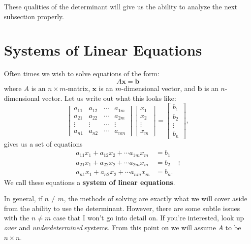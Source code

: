         These qualities of the determinant will give us the ability to analyze the next subsection properly.
        
        
        \section{Systems of Linear Equations}
        Often times we wish to solve equations of the form:
        \[
        A\mathbf{x}=\mathbf{b}
        \]
        where $A$ is an $n\times m$-matrix, $\mathbf{x}$ is an $m$-dimensional vector, and $\mathbf{b}$ is an $n$-dimensional vector.  Let us write out what this looks like:
        \[
        \begin{bmatrix}
        a_{11} & a_{12} & \cdots & a_{1m}\\
        a_{21} & a_{22} & \cdots & a_{2m}\\
        \vdots & \vdots & \cdots & \vdots\\
        a_{n1} & a_{n2} & \cdots & a_{nm}
        \end{bmatrix}
        \begin{bmatrix}
        x_1\\ x_2 \\ \vdots \\ x_m
        \end{bmatrix}
        =\begin{bmatrix}
        b_1 \\ b_2 \\ \vdots \\ b_n
        \end{bmatrix},
        \]
        gives us a set of equations
        \begin{align*}
        a_{11} x_1 + a_{12}x_2 + \cdots a_{1m} x_m &= b_1\\
        a_{21} x_1 + a_{22} x_2 + \cdots a_{2m} x_m &= b_2
        &\vdots\\
        a_{n1} x_1 + a_{n2} x_2 + \cdots a_{nm} x_m &= b_n.
        \end{align*}
        We call these equations a \textbf{system of linear equations}.
        
        In general, if $n\neq m$, the methods of solving are exactly what we will cover aside from the ability to use the determinant.  However, there are some subtle issues with the $n\neq m$ case that I won't go into detail on.  If you're interested, look up \emph{over} and \emph{underdetermined} systems. From this point on we will assume $A$ to be $n\times n$.
        
